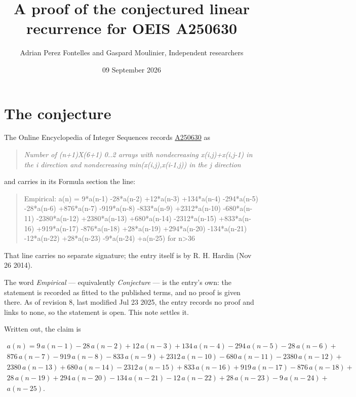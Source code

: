 \documentclass[11pt]{article}
\title{A proof of the conjectured linear recurrence for OEIS A250630}
\author{Adrian Perez Fontelles and Gaspard Moulinier, Independent researchers}
\date{09 September 2026}
\theoremstyle{definition}
\begin{document}
\maketitle
\section{The conjecture}

The Online Encyclopedia of Integer Sequences records \href{https://oeis.org/A250630}{A250630} as

\begin{quote}\itshape Number of (n+1)X(6+1) 0..2 arrays with nondecreasing x(i,j)+x(i,j-1) in the i direction and nondecreasing min(x(i,j),x(i-1,j)) in the j direction\end{quote}

and carries in its Formula section the line:

\begin{quote}\ttfamily Empirical: a(n) = 9*a(n-1) -28*a(n-2) +12*a(n-3) +134*a(n-4) -294*a(n-5) -28*a(n-6) +876*a(n-7) -919*a(n-8) -833*a(n-9) +2312*a(n-10) -680*a(n-11) -2380*a(n-12) +2380*a(n-13) +680*a(n-14) -2312*a(n-15) +833*a(n-16) +919*a(n-17) -876*a(n-18) +28*a(n-19) +294*a(n-20) -134*a(n-21) -12*a(n-22) +28*a(n-23) -9*a(n-24) +a(n-25) for n>36\end{quote}

That line carries no separate signature; the entry itself is by R. H. Hardin (Nov 26 2014).

The word {\itshape Empirical} --- equivalently {\itshape Conjecture} --- is the entry's own: the statement is recorded as fitted to the published terms, and no proof is given there. As of revision 8, last modified Jul 23 2025, the entry records no proof and links to none, so the statement is open. This note settles it.

Written out, the claim is

\begin{multline*} a(n) = 9\,a(n-1) - 28\,a(n-2) + 12\,a(n-3) + 134\,a(n-4) - 294\,a(n-5) - 28\,a(n-6) + \\ 876\,a(n-7) - 919\,a(n-8) - 833\,a(n-9) + 2312\,a(n-10) - 680\,a(n-11) - 2380\,a(n-12) + \\ 2380\,a(n-13) + 680\,a(n-14) - 2312\,a(n-15) + 833\,a(n-16) + 919\,a(n-17) - 876\,a(n-18) + \\ 28\,a(n-19) + 294\,a(n-20) - 134\,a(n-21) - 12\,a(n-22) + 28\,a(n-23) - 9\,a(n-24) + \\ a(n-25). \end{multline*}
\end{document}
